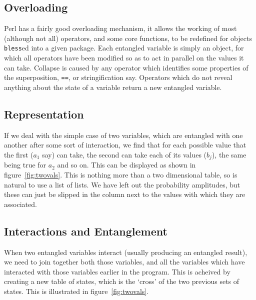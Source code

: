 \documentclass{article}      %
\newcommand{\ptt}[1]{\texttt{#1}}    %
\begin{document}
\subsection{Overloading}

Perl has a fairly good overloading mechanism, it allows the working of
most (although not all) operators, and some core functions, to be
redefined for objects \ptt{bless}ed into a given package.  Each
entangled variable is simply an object, for which all operators have
been modified so as to act in parallel on the values it can take.
Collapse is caused by any operator which identifies some properties of
the superposition, \verb+==+, or stringification say.  Operators which
do not reveal anything about the state of a variable return a new
entangled variable.

\subsection{Representation}

If we deal with the simple case of two variables, which are entangled
with one another after some sort of interaction, we find that for each
possible value that the first ($a_1$ say) can take, the second can
take each of its values ($b_j$), the same being true for $a_2$ and so
on.  This can be displayed as shown in figure~\ref{fig:twovals}.  This
is nothing more than a two dimensional table, so is natural to use
a list of lists.  We have left out the probability amplitudes, but
these can just be slipped in the column next to the values with which they are
associated.

\subsection{Interactions and Entanglement}

When two entangled variables interact (usually producing an entangled
result), we need to join together both those variables, and all the
variables which have interacted with those variables earlier in the
program.  This is acheived by creating a new table of states, which is
the `cross' of the two previous sets of states.  This is illustrated
in figure~\ref{fig:twovals}.
\end{document}
